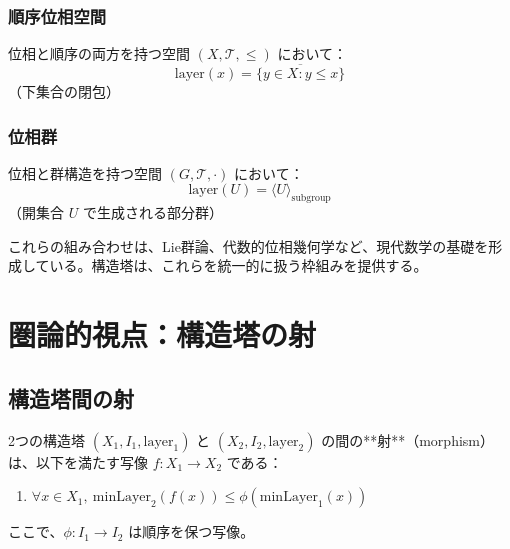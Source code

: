 \documentclass[a4paper,11pt]{ltjsarticle}
\begin{document}
\subsubsection{順序位相空間}

位相と順序の両方を持つ空間 $(X, \mathcal{T}, \leq)$ において：
\[
\text{layer}(x) = \overline{\{y \in X : y \leq x\}}
\]
（下集合の閉包）

\begin{center}
\end{center}

\subsubsection{位相群}

位相と群構造を持つ空間 $(G, \mathcal{T}, \cdot)$ において：
\[
\text{layer}(U) = \langle U \rangle_{\text{subgroup}}
\]
（開集合 $U$ で生成される部分群）

\begin{remarkbox}
これらの組み合わせは、Lie群論、代数的位相幾何学など、現代数学の基礎を形成している。構造塔は、これらを統一的に扱う枠組みを提供する。
\end{remarkbox}

\newpage

\section{圏論的視点：構造塔の射}

\subsection{構造塔間の射}

2つの構造塔 $(X_1, I_1, \text{layer}_1)$ と $(X_2, I_2, \text{layer}_2)$ の間の**射**（morphism）は、以下を満たす写像 $f : X_1 \to X_2$ である：

\begin{enumerate}
\item $\forall x \in X_1, \ \text{minLayer}_2(f(x)) \leq \phi(\text{minLayer}_1(x))$
\end{enumerate}

ここで、$\phi : I_1 \to I_2$ は順序を保つ写像。
\end{document}
